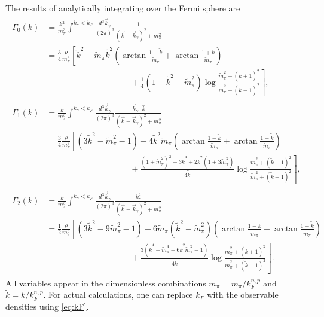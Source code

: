 The results of analytically integrating over the Fermi sphere are 
 \begin{align}
 \begin{split}
 \Gamma_{0}(k)&=\frac{k^2}{m_\pi^3}\int^{k_\gamma<k_F}\frac{d^3\vec{k}_\gamma}{(2\pi)^3} \frac{1}{(\vec{k}-\vec{k}_\gamma)^2+m_\pi^2} \\
 &=\frac{3}{4}\frac{\rho}{m_\pi^3}\left[  \tilde{k}^2 -\tilde{m}_\pi\tilde{k}^2\left(\arctan\frac{1-\tilde{k}}{\tilde{m}_\pi}+\arctan\frac{1+\tilde{k}}{\tilde{m}_\pi}\right)\right. \\
 &\left.\qquad\qquad\qquad\qquad\qquad+\frac{1}{4}\left(1-\tilde{k}^2+\tilde{m}_\pi^2\right)\log\frac{\tilde{m}_\pi^2+(\tilde{k}+1)^2}{\tilde{m}_\pi^2+(\tilde{k}-1)^2} \right],
 \end{split} \\
  \begin{split}
 \Gamma_{1}(k)&=\frac{k}{m_\pi^3}\int^{k_\gamma<k_F}\frac{d^3\vec{k}_\gamma}{(2\pi)^3} \frac{\vec{k}_\gamma\cdot\hat{k}}{(\vec{k}-\vec{k}_\gamma)^2+m_\pi^2} \\
 &=\frac{3}{4}\frac{\rho}{m_\pi^3}\left[  (3\tilde{k}^2-\tilde{m}_\pi^2-1)-4\tilde{k}^2\tilde{m}_\pi\left(\arctan\frac{1-\tilde{k}}{\tilde{m}_\pi}+\arctan\frac{1+\tilde{k}}{\tilde{m}_\pi}\right)\right. \\
 &\left.\qquad\qquad\qquad\qquad\qquad+\frac{(1+\tilde{m}_\pi^2)^2-3\tilde{k}^4+2\tilde{k}^2(1+3\tilde{m}_\pi^2)}{4\tilde{k}}\log\frac{\tilde{m}_\pi^2+(\tilde{k}+1)^2}{\tilde{m}_\pi^2+(\tilde{k}-1)^2} \right],
 \end{split} \\
  \begin{split}
 \Gamma_{2}(k)&=\frac{k}{m_\pi^3}\int^{k_\gamma<k_F}\frac{d^3\vec{k}_\gamma}{(2\pi)^3} \frac{k_\gamma^2}{(\vec{k}-\vec{k}_\gamma)^2+m_\pi^2} \\
 &=\frac{1}{2}\frac{\rho}{m_\pi^3}\left[  (3\tilde{k}^2-9\tilde{m}_\pi^2-1)-6\tilde{m}_\pi(\tilde{k}^2-\tilde{m}_\pi^2)\left(\arctan\frac{1-\tilde{k}}{\tilde{m}_\pi}+\arctan\frac{1+\tilde{k}}{\tilde{m}_\pi}\right)\right. \\
 &\left.\qquad\qquad\qquad\qquad\qquad+\frac{3\left(\tilde{k}^4+\tilde{m}_\pi^4-6\tilde{k}^2\tilde{m}_\pi^2-1\right)}{4\tilde{k}}\log\frac{\tilde{m}_\pi^2+(\tilde{k}+1)^2}{\tilde{m}_\pi^2+(\tilde{k}-1)^2} \right].
 \end{split} 
  \end{align}
All variables appear in the dimensionless combinations $\tilde{m}_\pi=m_\pi/k_F^{n,p}$ and $\tilde{k}=k/k_F^{n,p}$. For actual calculations, one can replace $k_F$ with the observable densities using \eqref{eq:kF}.

